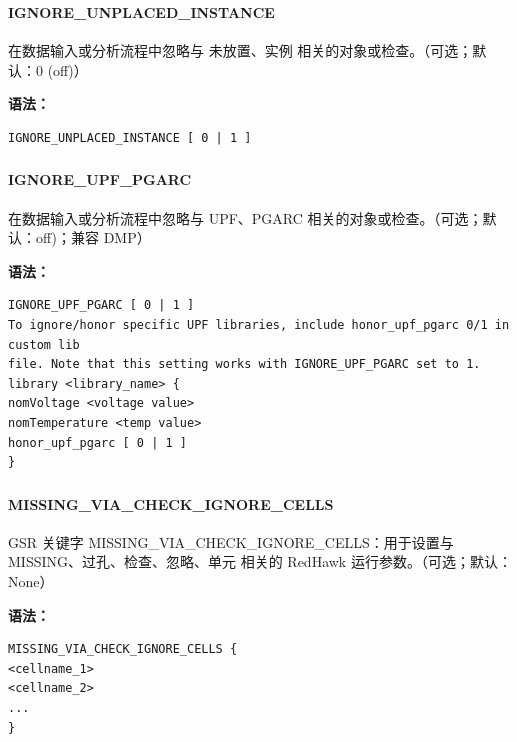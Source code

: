 \subsubsection{}
\paragraph*{IGNORE_UNPLACED_INSTANCE}

在数据输入或分析流程中忽略与 未放置、实例 相关的对象或检查。（可选；默认：0 (off)）

\textbf{语法：}
\begin{lstlisting}
IGNORE_UNPLACED_INSTANCE [ 0 | 1 ]
\end{lstlisting}

\subsubsection{}
\paragraph*{IGNORE_UPF_PGARC}

在数据输入或分析流程中忽略与 UPF、PGARC 相关的对象或检查。（可选；默认：off)；兼容 DMP）

\textbf{语法：}
\begin{lstlisting}
IGNORE_UPF_PGARC [ 0 | 1 ]
To ignore/honor specific UPF libraries, include honor_upf_pgarc 0/1 in custom lib
file. Note that this setting works with IGNORE_UPF_PGARC set to 1.
library <library_name> {
nomVoltage <voltage value>
nomTemperature <temp value>
honor_upf_pgarc [ 0 | 1 ]
}
\end{lstlisting}

\subsubsection{}
\paragraph*{MISSING_VIA_CHECK_IGNORE_CELLS}

GSR 关键字 MISSING_VIA_CHECK_IGNORE_CELLS：用于设置与 MISSING、过孔、检查、忽略、单元 相关的 RedHawk 运行参数。（可选；默认：None）

\textbf{语法：}
\begin{lstlisting}
MISSING_VIA_CHECK_IGNORE_CELLS {
<cellname_1>
<cellname_2>
...
}
\end{lstlisting}

